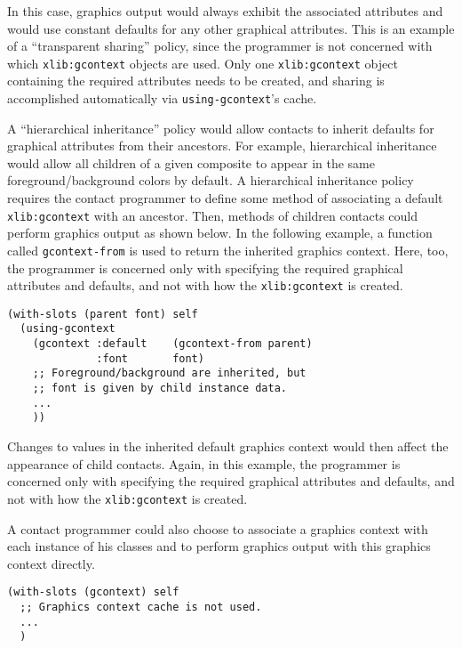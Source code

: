 In this case, graphics output would always exhibit the associated
attributes and would use constant defaults for any other graphical
attributes.
This is an example of a ``transparent sharing'' policy, since the
programmer is not concerned with which {\tt xlib:gcontext} objects are
used.  Only one {\tt xlib:gcontext} object containing the required
attributes needs to be created, and sharing is accomplished
automatically via {\tt using-gcontext}'s cache.


A ``hierarchical inheritance'' policy would allow contacts to inherit
defaults for graphical attributes from their ancestors. For example,
hierarchical inheritance would allow all children of a given composite
to appear in the same foreground/background colors by default. A
hierarchical inheritance policy requires the contact programmer to
define some
method of associating a default {\tt xlib:gcontext} with an ancestor.
Then, methods of children contacts could perform graphics output
as shown below. In the following example, a function called {\tt gcontext-from}
is used to return the inherited graphics context. Here, too, the
programmer is concerned only
with specifying the required graphical attributes and defaults, and not
with how the {\tt xlib:gcontext} is created.

\pagebreak
{\samepage
\begin{center}
\begin{verbatim}
(with-slots (parent font) self
  (using-gcontext
    (gcontext :default    (gcontext-from parent) 
              :font       font)
    ;; Foreground/background are inherited, but
    ;; font is given by child instance data.
    ...
    ))
\end{verbatim}

\end{center}}

Changes to values in the inherited default graphics context would then
affect the appearance of child contacts.
Again, in this example, the
programmer is concerned only
with specifying the required graphical attributes and defaults, and not
with how the {\tt xlib:gcontext} is created.

A contact programmer could also choose to associate a graphics context
with each instance of his classes and to perform graphics output with
this graphics context directly.

{\samepage
\begin{center}
\begin{verbatim}
(with-slots (gcontext) self
  ;; Graphics context cache is not used.
  ...
  )
\end{verbatim}

\end{center}}

